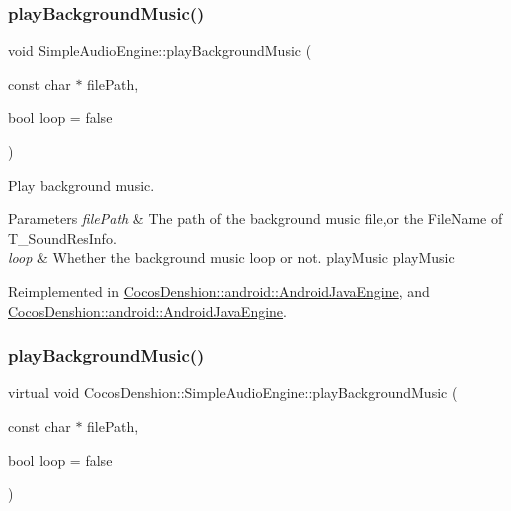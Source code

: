 \subsubsection{\texorpdfstring{play\+Background\+Music()}{playBackgroundMusic()}\hspace{0.1cm}{\footnotesize\ttfamily [1/2]}}
{\footnotesize\ttfamily void Simple\+Audio\+Engine\+::play\+Background\+Music (\begin{DoxyParamCaption}\item[{const char $\ast$}]{file\+Path,  }\item[{bool}]{loop = {\ttfamily false} }\end{DoxyParamCaption})\hspace{0.3cm}{\ttfamily [virtual]}}

Play background music.


\begin{DoxyParams}{Parameters}
{\em file\+Path} & The path of the background music file,or the File\+Name of T\+\_\+\+Sound\+Res\+Info. \\
\hline
{\em loop} & Whether the background music loop or not.  play\+Music  play\+Music \\
\hline
\end{DoxyParams}


Reimplemented in \hyperlink{classCocosDenshion_1_1android_1_1AndroidJavaEngine_aeb8086c0fa8689075d4e2d2bf05f9439}{Cocos\+Denshion\+::android\+::\+Android\+Java\+Engine}, and \hyperlink{classCocosDenshion_1_1android_1_1AndroidJavaEngine_a510170bb28df6e2035ad479831e6ef33}{Cocos\+Denshion\+::android\+::\+Android\+Java\+Engine}.

\mbox{\label{classCocosDenshion_1_1SimpleAudioEngine_a1b61a76779b623c1534839146f8a5483}} 
\subsubsection{\texorpdfstring{play\+Background\+Music()}{playBackgroundMusic()}\hspace{0.1cm}{\footnotesize\ttfamily [2/2]}}
{\footnotesize\ttfamily virtual void Cocos\+Denshion\+::\+Simple\+Audio\+Engine\+::play\+Background\+Music (\begin{DoxyParamCaption}\item[{const char $\ast$}]{file\+Path,  }\item[{bool}]{loop = {\ttfamily false} }\end{DoxyParamCaption})\hspace{0.3cm}{\ttfamily [virtual]}}

